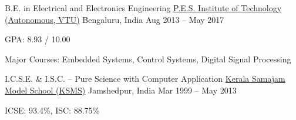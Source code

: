 \begin{cventries}
	\cventry
	{B.E. in Electrical and Electronics Engineering}
	{\href{https://pesit.pes.edu/}{P.E.S. Institute of Technology (Autonomous, VTU)}}
	{Bengaluru, India}
	{Aug 2013 -- May 2017}
	{
		\begin{cvitems}
		\item{GPA: 8.93 / 10.00}
		\item{Major Courses: Embedded Systems, Control Systems, Digital Signal Processing}
		\end{cvitems}
	}

	\cventry
	{I.C.S.E. \& I.S.C. -- Pure Science with Computer Application}
	{\href{https://ksms.ac.in/}{Kerala Samajam Model School (KSMS)}}
	{Jamshedpur, India}
	{Mar 1999 -- May 2013}
	{
		\begin{cvitems}
		\item{ICSE: 93.4\%, ISC: 88.75\%}
		\end{cvitems}
	}
\end{cventries}
